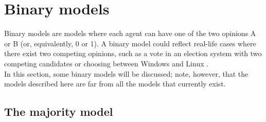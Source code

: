 \documentclass[11 pt , letterpaper , twoside , openright]{book}
\begin{document}
\section{Binary models}\label{Bin}

Binary models are models where each agent can have one of the two opinions A or B (or, equivalently, 0 or 1). A binary model could reflect real-life cases where there exist two competing opinions, such as a vote in an election system with two competing candidates or choosing between Windows and Linux \cite{Nguyen2020}.\\
In this section, some binary models will be discussed; note, however, that the models described here are far from all the models that currently exist.

\subsection{The majority model}\label{majModel}
\end{document}
